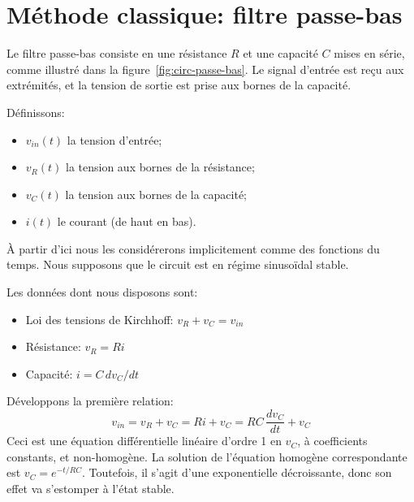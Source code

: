 \section{Méthode classique: filtre passe-bas}

Le filtre passe-bas consiste en une résistance $R$ et une capacité $C$
mises en série,
comme illustré dans la figure~\ref{fig:circ-passe-bas}.
Le signal d'entrée est reçu aux extrémités, et la tension de sortie est prise
aux bornes de la capacité.

Définissons:
\begin{itemize}
    \item $v_{in}(t)$ la tension d'entrée;
    \item $v_R(t)$ la tension aux bornes de la résistance;
    \item $v_C(t)$ la tension aux bornes de la capacité;
    \item $i(t)$ le courant (de haut en bas).
\end{itemize}

À partir d'ici nous les considérerons implicitement
comme des fonctions du temps.
Nous supposons que le circuit est en régime sinusoïdal stable.

Les données dont nous disposons sont:
\begin{itemize}
    \item Loi des tensions de Kirchhoff: $v_R + v_C = v_{in}$
    \item Résistance: $v_R = Ri$
    \item Capacité: $i = C\,dv_C/dt$
\end{itemize}

Développons la première relation:
\begin{equation}
    v_{in} = v_R + v_C = Ri + v_C = RC\,\frac{dv_C}{dt} + v_C
\end{equation}
Ceci est une équation différentielle linéaire d'ordre 1 en $v_C$,
à coefficients constants, et non-homogène.
La solution de l'équation homogène correspondante est $v_C = e^{-t/RC}$.
Toutefois, il s'agit d'une exponentielle décroissante,
donc son effet va s'estomper à l'état stable.

